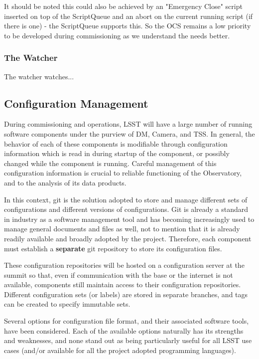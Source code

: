 It should be noted this could also be achieved by an "Emergency Close" script inserted on top of the ScriptQueue and an abort on the current running script (if there is one) - the ScriptQueue supports this.  So the OCS remains a low priority to be developed during commissioning as we understand the needs better.

\subsubsection{The Watcher}\label{sect:watcher}
The watcher watches... 


\subsection{Configuration Management}\label{sect:config}
During commissioning and operations, LSST will have a large number of running software components under the purview of DM, Camera, and TSS. In general, the behavior of each of these components is modifiable through configuration information which is read in during startup of the component, or possibly changed while the component is running. Careful management of this configuration information is crucial to reliable functioning of the Observatory, and to the analysis of its data products.

In this context, git is the solution adopted to store and manage different sets of configurations and different versions of configurations. Git is already a standard in industry as a software management tool and has becoming increasingly used to manage general documents and files as well, not to mention that it is already readily available and broadly adopted by the project. Therefore, each component must establish a {\bf separate} git repository to store its configuration files. 

These configuration repositories will be hosted on a configuration server at the summit so that, even if communication with the base or the internet is not available, components still maintain access to their configuration repositories. Different configuration sets (or labels) are stored in separate branches, and tags can be created to specify immutable sets. 

Several options for configuration file format, and their associated software tools, have been considered. Each of the available options naturally has its strengths and weaknesses, and none stand out as being particularly useful for all LSST use cases (and/or available for all the project adopted programming languages).

